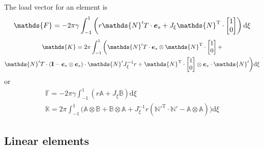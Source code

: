 \documentclass[a4paper,11pt]{article}
\renewcommand{\to}[1]{\text{\boldmath $#1$}} %
\newcommand{\ts}[1]{\text{\boldmath $\mathrm{#1}$}} %
\newcommand{\uv}[1]{\mathds{#1}}
\newcommand{\um}[1]{\mathds{#1}}
\newcommand{\intd}[1]{\mathrm{d}#1}
\newcommand{\T}{\mathrm{T}}
\DeclareMathOperator{\sign}{sign}
\begin{document}
The load vector for an element is
\begin{gather}
 \uv F = -2\pi \gamma \int_{-1}^{1} \left(r{\um N}'^\T\cdot\to e_s + J_\xi{\um N}^\T\cdot\begin{bmatrix}1\\0\end{bmatrix}\right) \intd\xi
\end{gather}
\begin{multline}
 \um K = 2\pi \int_{-1}^{1} \bigg(
	{\um N}'^\T \cdot \to e_s \otimes {\um N}^\T\cdot \begin{bmatrix}1\\0\end{bmatrix} +\\
	{\um N}'^\T \cdot (\ts I - \to e_s\otimes \to e_s)\cdot {\um N}' J_\xi^{-1} r +
	{\um N}^\T \cdot \begin{bmatrix}1\\0\end{bmatrix}\otimes \to e_s\cdot {\um N}'
	\bigg)\intd\xi
\end{multline}
or
\begin{gather}
  \uv F = -2\pi \gamma \int_{-1}^{1} \left(r\uv A + J_\xi\uv B\right) \intd\xi\\
  \um K = 2\pi \int_{-1}^{1} \bigg(
	\uv A \otimes \uv B +
	\uv B\otimes \uv A +
	J_\xi^{-1} r({\um N}'^\T \cdot {\um N}' - \uv A\otimes \uv A)
	\bigg)\intd\xi
\end{gather}

\subsection{Linear elements}
\end{document}
